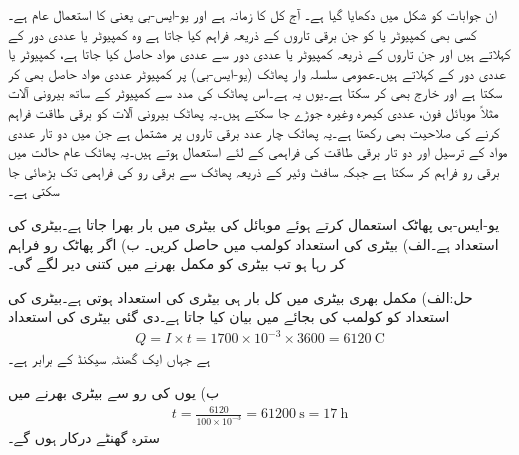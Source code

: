 ان جوابات کو شکل  میں دکھایا گیا ہے۔
آج کل  کا زمانہ ہے اور  یو-ایس-بی یعنی  کا استعمال عام ہے۔کسی بھی کمپیوٹر یا  کو  جن برقی تاروں کے ذریعہ فراہم کیا جاتا ہے وہ کمپیوٹر یا عددی دور کے  کہلاتے ہیں اور جن تاروں کے ذریعہ کمپیوٹر یا عددی دور سے عددی مواد حاصل کیا جاتا ہے، کمپیوٹر یا عددی دور کے   کہلاتے ہیں۔عمومی سلسلہ وار پھاٹک (یو-ایس-بی) پر کمپیوٹر عددی مواد حاصل بھی کر سکتا ہے اور خارج بھی  کر سکتا ہے۔یوں یہ  ہے۔اس پھاٹک کی مدد سے کمپیوٹر کے ساتھ بیرونی آلات مثلاً موبائل فون، عددی کیمرہ وغیرہ جوڑے جا سکتے ہیں۔یہ پھاٹک بیرونی آلات کو برقی طاقت فراہم کرنے کی صلاحیت بھی رکھتا ہے۔یہ پھاٹک چار عدد برقی تاروں پر مشتمل ہے جن میں دو تار عددی مواد کے ترسیل اور دو تار برقی طاقت کی فراہمی کے لئے استعمال ہوتے ہیں۔یہ پھاٹک عام حالت میں  برقی رو فراہم کر سکتا ہے جبکہ سافٹ وئیر کے ذریعہ پھاٹک سے برقی رو کی فراہمی  تک بڑھائی جا سکتی ہے۔

یو-ایس-بی پھاٹک استعمال کرتے ہوئے موبائل کی  بیٹری میں بار بھرا جاتا ہے۔بیٹری کی استعداد  ہے۔الف) بیٹری کی استعداد کولمب  میں حاصل کریں۔ ب) اگر پھاٹک  رو فراہم کر رہا ہو تب بیٹری کو مکمل بھرنے میں کتنی دیر لگے گی۔ 

حل:الف) مکمل بھری بیٹری میں کل بار ہی بیٹری کی استعداد ہوتی ہے۔بیٹری کی استعداد کو کولمب  کی بجائے  میں بیان کیا جاتا ہے۔دی گئی بیٹری کی استعداد
\begin{align*}
Q=I\times t=1700 \times 10^{-3} \times 3600=\SI{6120}{\coulomb}
\end{align*}
ہے جہاں ایک گھنٹہ   سیکنڈ کے برابر ہے۔ 

ب) یوں  کی رو سے بیٹری بھرنے میں
\begin{align*}
t=\frac{6120}{100\times 10^{-3}}=\SI{61200}{\second} =\SI{17}{\hour}
\end{align*}
سترہ گھنٹے درکار ہوں گے۔
